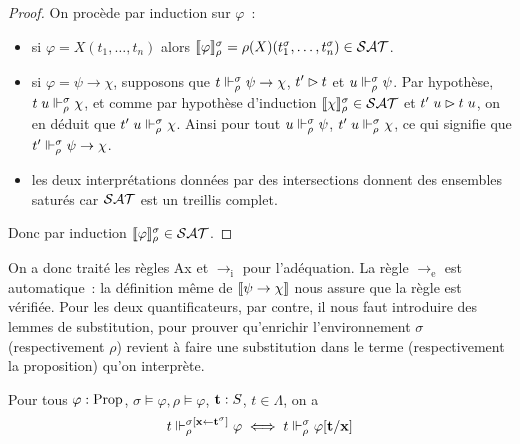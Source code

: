 \documentclass{article}
\begin{document}
\begin{proof}
  On procède par induction sur $\varphi$~:
  \begin{itemize}
  \item si $\varphi = X(t_1,\ldots,t_n)$ alors $\llbracket \varphi \rrbracket_\rho^\sigma=\rho(X)(t_1^\sigma,\ldots,t_n^\sigma)\in \mathcal {SAT}$.
  \item si $\varphi = \psi \to \chi$, supposons que $t\Vdash_\rho^\sigma \psi \to \chi$, $t'\rhd t$ et $u\Vdash_\rho^\sigma\psi$. Par hypothèse, $t\;u\Vdash_\rho^\sigma \chi$, et comme par hypothèse d'induction $\llbracket \chi \rrbracket_\rho^\sigma\in\mathcal {SAT}$ et $t'\;u\rhd t\;u$, on en déduit que $t'\;u\Vdash_\rho^\sigma \chi$. Ainsi pour tout $u\Vdash_\rho^\sigma\psi$, $t'\;u\Vdash_\rho^\sigma\chi$, ce qui signifie que $t'\Vdash_\rho^\sigma\psi\to\chi$.
  \item les deux interprétations données par des intersections donnent des ensembles saturés car $\mathcal {SAT}$ est un treillis complet.
  \end{itemize}
  Donc par induction $\llbracket \varphi \rrbracket_\rho^\sigma\in\mathcal {SAT}$.
\end{proof}

On a donc traité les règles Ax et $\to_\mathrm i$ pour l'adéquation. La règle $\to_\mathrm e$ est automatique~: la définition même de $\llbracket \psi\to\chi \rrbracket$ nous assure que la règle est vérifiée. Pour les deux quantificateurs, par contre, il nous faut introduire des lemmes de substitution, pour prouver qu'enrichir l'environnement $\sigma$ (respectivement $\rho$) revient à faire une substitution dans le terme (respectivement la proposition) qu'on interprète.

\begin{lem}\label{lem.subst.1}
  Pour tous $\varphi : \mathrm{Prop}$, $\sigma\models\varphi,\rho\models\varphi$, $\mathbf{t} : S$, $t\in\Lambda$, on a
  \[t\Vdash_\rho^{\sigma[\mathbf{x} \leftarrow \mathbf{t}^\sigma]} \varphi\iff t\Vdash_\rho^\sigma \varphi[\mathbf{t}/\mathbf{x}]\]
\end{lem}
\end{document}
